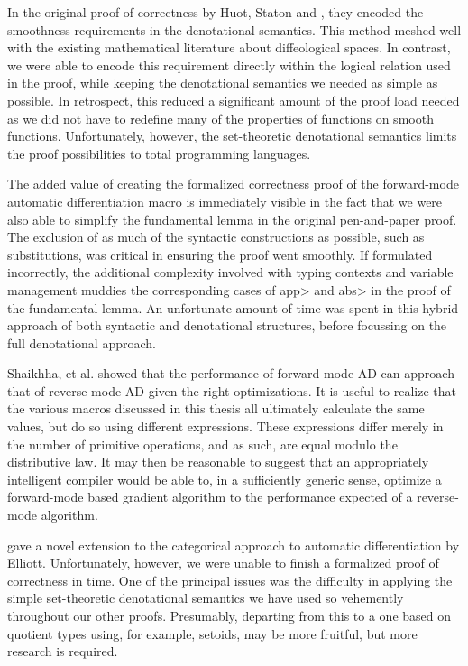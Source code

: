 In the original proof of correctness by Huot, Staton and \Vakar{}\cite{huot2020correctness}, they encoded the smoothness requirements in the denotational semantics.
This method meshed well with the existing mathematical literature about diffeological spaces.
In contrast, we were able to encode this requirement directly within the logical relation used in the proof, while keeping the denotational semantics we needed as simple as possible.
In retrospect, this reduced a significant amount of the proof load needed as we did not have to redefine many of the properties of functions on smooth functions.
Unfortunately, however, the set-theoretic denotational semantics limits the proof possibilities to total programming languages.

The added value of creating the formalized correctness proof of the forward-mode automatic differentiation macro is immediately visible in the fact that we were also able to simplify the fundamental lemma in the original pen-and-paper proof.
The exclusion of as much of the syntactic constructions as possible, such as substitutions, was critical in ensuring the proof went smoothly.
If formulated incorrectly, the additional complexity involved with typing contexts and variable management muddies the corresponding cases of \<app> and \<abs> in the proof of the fundamental lemma.
An unfortunate amount of time was spent in this hybrid approach of both syntactic and denotational structures, before focussing on the full denotational approach.

Shaikhha, et al.\cite{Shaikha2019} showed that the performance of forward-mode AD can approach that of reverse-mode AD given the right optimizations.
It is useful to realize that the various macros discussed in this thesis all ultimately calculate the same values, but do so using different expressions.
These expressions differ merely in the number of primitive operations, and as such, are equal modulo the distributive law.
It may then be reasonable to suggest that an appropriately intelligent compiler would be able to, in a sufficiently generic sense, optimize a forward-mode based gradient algorithm to the performance expected of a reverse-mode algorithm.

\Vakar{}\cite{vkr2020reverse} gave a novel extension to the categorical approach to automatic differentiation by Elliott\cite{Elliott-2018-ad-icfp}.
Unfortunately, however, we were unable to finish a formalized proof of correctness in time.
One of the principal issues was the difficulty in applying the simple set-theoretic denotational semantics we have used so vehemently throughout our other proofs.
Presumably, departing from this to a one based on quotient types using, for example, setoids, may be more fruitful, but more research is required.

